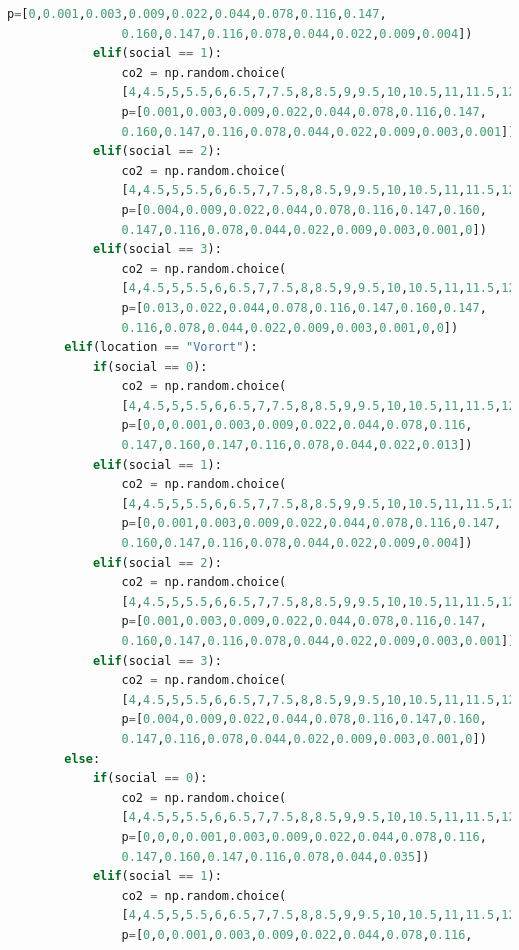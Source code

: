 \documentclass[a4paper,12pt]{report}
\begin{document}
\begin{lstlisting}[language=Python,label={lst:Sz2Z3},caption=Dritte Zelle für das Generieren der Daten]
                p=[0,0.001,0.003,0.009,0.022,0.044,0.078,0.116,0.147,
                0.160,0.147,0.116,0.078,0.044,0.022,0.009,0.004])
            elif(social == 1):
                co2 = np.random.choice(
                [4,4.5,5,5.5,6,6.5,7,7.5,8,8.5,9,9.5,10,10.5,11,11.5,12], 
                p=[0.001,0.003,0.009,0.022,0.044,0.078,0.116,0.147,
                0.160,0.147,0.116,0.078,0.044,0.022,0.009,0.003,0.001])
            elif(social == 2):
                co2 = np.random.choice(
                [4,4.5,5,5.5,6,6.5,7,7.5,8,8.5,9,9.5,10,10.5,11,11.5,12], 
                p=[0.004,0.009,0.022,0.044,0.078,0.116,0.147,0.160,
                0.147,0.116,0.078,0.044,0.022,0.009,0.003,0.001,0])
            elif(social == 3):
                co2 = np.random.choice(
                [4,4.5,5,5.5,6,6.5,7,7.5,8,8.5,9,9.5,10,10.5,11,11.5,12], 
                p=[0.013,0.022,0.044,0.078,0.116,0.147,0.160,0.147,
                0.116,0.078,0.044,0.022,0.009,0.003,0.001,0,0])
        elif(location == "Vorort"):
            if(social == 0):
                co2 = np.random.choice(
                [4,4.5,5,5.5,6,6.5,7,7.5,8,8.5,9,9.5,10,10.5,11,11.5,12], 
                p=[0,0,0.001,0.003,0.009,0.022,0.044,0.078,0.116,
                0.147,0.160,0.147,0.116,0.078,0.044,0.022,0.013])
            elif(social == 1):
                co2 = np.random.choice(
                [4,4.5,5,5.5,6,6.5,7,7.5,8,8.5,9,9.5,10,10.5,11,11.5,12], 
                p=[0,0.001,0.003,0.009,0.022,0.044,0.078,0.116,0.147,
                0.160,0.147,0.116,0.078,0.044,0.022,0.009,0.004])
            elif(social == 2):
                co2 = np.random.choice(
                [4,4.5,5,5.5,6,6.5,7,7.5,8,8.5,9,9.5,10,10.5,11,11.5,12], 
                p=[0.001,0.003,0.009,0.022,0.044,0.078,0.116,0.147,
                0.160,0.147,0.116,0.078,0.044,0.022,0.009,0.003,0.001])
            elif(social == 3):
                co2 = np.random.choice(
                [4,4.5,5,5.5,6,6.5,7,7.5,8,8.5,9,9.5,10,10.5,11,11.5,12], 
                p=[0.004,0.009,0.022,0.044,0.078,0.116,0.147,0.160,
                0.147,0.116,0.078,0.044,0.022,0.009,0.003,0.001,0])
        else:
            if(social == 0):
                co2 = np.random.choice(
                [4,4.5,5,5.5,6,6.5,7,7.5,8,8.5,9,9.5,10,10.5,11,11.5,12], 
                p=[0,0,0,0.001,0.003,0.009,0.022,0.044,0.078,0.116,
                0.147,0.160,0.147,0.116,0.078,0.044,0.035])
            elif(social == 1):
                co2 = np.random.choice(
                [4,4.5,5,5.5,6,6.5,7,7.5,8,8.5,9,9.5,10,10.5,11,11.5,12], 
                p=[0,0,0.001,0.003,0.009,0.022,0.044,0.078,0.116,

\end{lstlisting}
\end{document}
